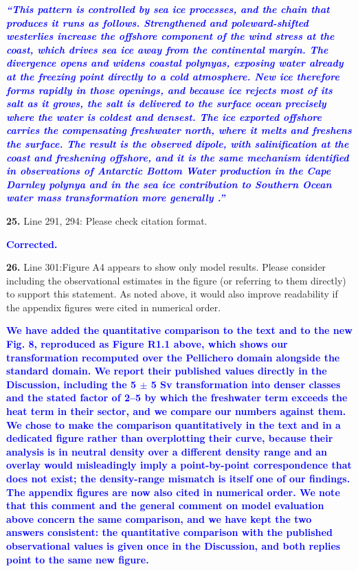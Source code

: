 \documentclass[pdflatex,sn-nature]{sn-jnl}
\begin{document}
\medskip
\noindent\textcolor{blue}{\textbf{\textit{``This pattern is controlled by sea ice processes, and the chain that produces it runs as follows. Strengthened and poleward-shifted westerlies increase the offshore component of the wind stress at the coast, which drives sea ice away from the continental margin. The divergence opens and widens coastal polynyas, exposing water already at the freezing point directly to a cold atmosphere. New ice therefore forms rapidly in those openings, and because ice rejects most of its salt as it grows, the salt is delivered to the surface ocean precisely where the water is coldest and densest. The ice exported offshore carries the compensating freshwater north, where it melts and freshens the surface. The result is the observed dipole, with salinification at the coast and freshening offshore, and it is the same mechanism identified in observations of Antarctic Bottom Water production in the Cape Darnley polynya and in the sea ice contribution to Southern Ocean water mass transformation more generally .''}}}
\medskip

\medskip
\noindent \textbf{25.} Line 291, 294: Please check citation format.
\medskip

\noindent\textcolor{blue}{\textbf{Corrected.}}


\medskip
\noindent \textbf{26.} Line 301:Figure A4 appears to show only model results. Please consider including the observational estimates in the figure (or referring to them directly) to support this statement. As noted above, it would also improve readability if the appendix figures were cited in numerical order.
\medskip

\noindent\textcolor{blue}{\textbf{We have added the quantitative comparison to the text and to the new Fig. 8, reproduced as Figure R1.1 above, which shows our transformation recomputed over the Pellichero domain alongside the standard domain. We report their published values directly in the Discussion, including the 5 $\pm$ 5 Sv transformation into denser classes and the stated factor of 2--5 by which the freshwater term exceeds the heat term in their sector, and we compare our numbers against them. We chose to make the comparison quantitatively in the text and in a dedicated figure rather than overplotting their curve, because their analysis is in neutral density over a different density range and an overlay would misleadingly imply a point-by-point correspondence that does not exist; the density-range mismatch is itself one of our findings. The appendix figures are now also cited in numerical order. We note that this comment and the general comment on model evaluation above concern the same comparison, and we have kept the two answers consistent: the quantitative comparison with the published observational values is given once in the Discussion, and both replies point to the same new figure.}}
\end{document}
